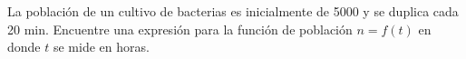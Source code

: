 \item La población de un cultivo de bacterias es inicialmente de 5000 y se duplica cada 20 min. Encuentre una expresión para la función de población $n = f(t)$ en donde $t$ se mide en horas.

